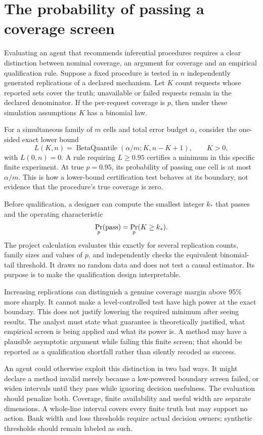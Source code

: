 \section{The probability of passing a coverage screen}
\label{v13:la-screen}

Evaluating an agent that recommends inferential procedures requires a clear
distinction between nominal coverage, an argument for coverage and an empirical
qualification rule. Suppose a fixed procedure is tested in $n$ independently
generated replications of a declared mechanism. Let $K$ count requests whose
reported sets cover the truth; unavailable or failed requests remain in the
declared denominator. If the per-request coverage is $p$, then under these
simulation assumptions $K$ has a binomial law.

For a simultaneous family of $m$ cells and total error budget $\alpha$, consider
the one-sided exact lower bound
\[
 L(K,n)=\operatorname{BetaQuantile}
       (\alpha/m;K,n-K+1),\qquad K>0,
\]
with $L(0,n)=0$. A rule requiring $L\geq0.95$ certifies a minimum in this
specific finite experiment. At true $p=0.95$, its probability of passing one
cell is at most $\alpha/m$. This is how a lower-bound certification test behaves
at its boundary, not evidence that the procedure's true coverage is zero.

Before qualification, a designer can compute the smallest integer $k_*$ that
passes and the operating characteristic
\[
 \Pr_p(\hbox{pass})=\Pr_p(K\geq k_*).
\]
The project calculation evaluates this exactly for several replication counts,
family sizes and values of $p$, and independently checks the equivalent
binomial-tail threshold. It draws no random data and does not test a causal
estimator. Its purpose is to make the qualification design interpretable.
\cite{v13_project_exact}

Increasing replications can distinguish a genuine coverage margin above 95\%
more sharply. It cannot make a level-controlled test have high power at the
exact boundary. This does not justify lowering the required minimum after
seeing results. The analyst must state what guarantee is theoretically justified,
what empirical screen is being applied and what its power is. A method may
have a plausible asymptotic argument while failing this finite screen; that
should be reported as a qualification shortfall rather than silently recoded
as success.

An agent could otherwise exploit this distinction in two bad ways. It might
declare a method invalid merely because a low-powered boundary screen failed,
or widen intervals until they pass while ignoring decision usefulness. The
evaluation should penalize both. Coverage, finite availability and useful width
are separate dimensions. A whole-line interval covers every finite truth but
may support no action. Bank width and loss thresholds require actual decision
owners; synthetic thresholds should remain labeled as such.


